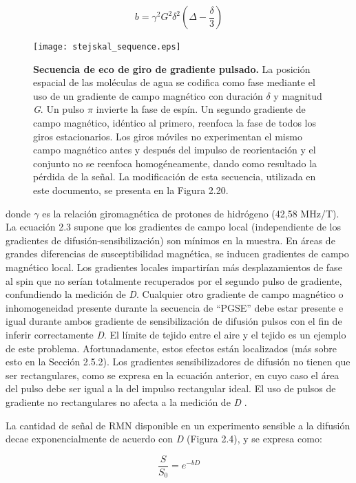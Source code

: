 \documentclass[12pt,a5,twoside]{book}
\begin{document}
\begin{equation}
b = \gamma^2G^2\delta^2 (\Delta - \frac{\delta}{3})
\end{equation}

\begin{figure}
	\centering
    \texttt{[image: stejskal\_sequence.eps]}
    \caption{\textbf{Secuencia de eco de giro de gradiente pulsado.} La posición espacial de las moléculas de agua se codifica como fase mediante el uso de un gradiente de campo magnético con duración \(\delta\) y magnitud {\it G}. Un pulso \(\pi\) invierte la fase de espín. Un segundo gradiente de campo magnético, idéntico al primero, reenfoca la fase de todos los giros estacionarios. Los giros móviles no experimentan el mismo campo magnético antes y después del impulso de reorientación y el conjunto no se reenfoca homogéneamente, dando como resultado la pérdida de la señal. La modificación de esta secuencia, utilizada en este documento, se presenta en la Figura 2.20.}
    \label{F:stejskal_sequence}
\end{figure}

donde \(\gamma\) es la relación giromagnética de protones de hidrógeno (42,58 MHz/T). La ecuación 2.3 supone que los gradientes de campo local (independiente de los gradientes de difusión-sensibilización) son mínimos en la muestra. En áreas de grandes diferencias de susceptibilidad magnética, se inducen gradientes de campo magnético local. Los gradientes locales impartirían más desplazamientos de fase al spin que no serían totalmente recuperados por el segundo pulso de gradiente, confundiendo la medición de {\it D}. Cualquier otro gradiente de campo magnético o inhomogeneidad presente durante la secuencia de ``PGSE'' debe estar presente e igual durante ambos gradiente de sensibilización de difusión pulsos con el fin de inferir correctamente {\it D}. El límite de tejido entre el aire y el tejido es un ejemplo de este problema. Afortunadamente, estos efectos están localizados (más sobre esto en la Sección 2.5.2). Los gradientes sensibilizadores de difusión no tienen que ser rectangulares, como se expresa en la ecuación anterior, en cuyo caso el área del pulso debe ser igual a la del impulso rectangular ideal. El uso de pulsos de gradiente no rectangulares no afecta a la medición de {\it D} \citep{Price_1991}.

La cantidad de señal de RMN disponible en un experimento sensible a la difusión decae exponencialmente de acuerdo con {\it D} (Figura 2.4), y se expresa como:

\begin{equation}
\frac{S}{S_0} = e^{-bD}
\end{equation}
\end{document}
